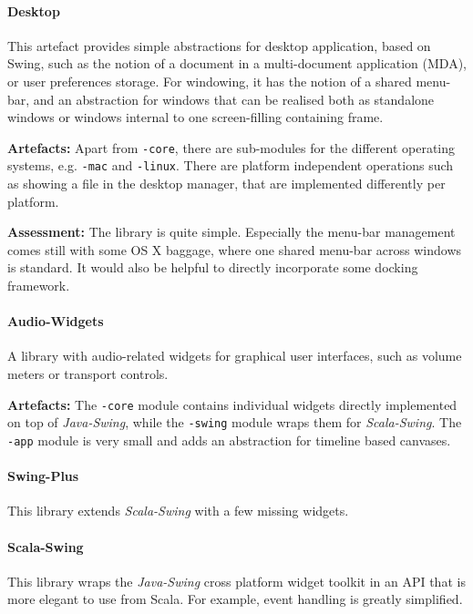 \documentclass[11pt,a4paper]{article}
\newcommand{\software}[1]{\textit{#1}}
\begin{document}
\paragraph{Desktop}

This artefact provides simple abstractions for desktop application, based on Swing, such as the notion of a document in a multi-document application (MDA), or user preferences storage. For windowing, it has the notion of a shared menu-bar, and an abstraction for windows that can be realised both as standalone windows or windows internal to one screen-filling containing frame.

\textbf{Artefacts:} Apart from \verb!-core!, there are sub-modules for the different operating systems, e.g. \verb!-mac! and \verb!-linux!. There are platform independent operations such as showing a file in the desktop manager, that are implemented differently per platform. 

\textbf{Assessment:} The library is quite simple. Especially the menu-bar management comes still with some OS X baggage, where one shared menu-bar across windows is standard. It would also be helpful to directly incorporate some docking framework.

\paragraph{Audio-Widgets}

A library with audio-related widgets for graphical user interfaces, such as volume meters or transport controls.

\textbf{Artefacts:} The \verb!-core! module contains individual widgets directly implemented on top of \software{Java-Swing}, while the \verb!-swing! module wraps them for \software{Scala-Swing}. The \verb!-app! module is very small and adds an abstraction for timeline based canvases.

\paragraph{Swing-Plus}

This library extends \software{Scala-Swing} with a few missing widgets.

\paragraph{Scala-Swing}

This library wraps the \software{Java-Swing} cross platform widget toolkit in an API that is more elegant to use from Scala. For example, event handling is greatly simplified.
\end{document}
